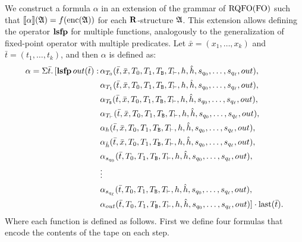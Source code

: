 We construct a formula $\alpha$ in an extension of the grammar of ${\rm RQFO}({\rm FO})$ such that ${\llbracket{}{\alpha}\rrbracket}(\mathfrak{A}) = f({\rm enc}(\mathfrak{A}))$ for each $\mathbf{R}$-structure $\mathfrak{A}$. This extension allows defining the operator ${\bf lsfp}$ for multiple functions, analogously to the generalization of fixed-point operator with multiple predicates. Let $\bar{x} = (x_1,\ldots,x_k)$ and $\bar{t} = (t_1,\ldots,t_k)$, and then $\alpha$ is defined as:
\begin{align*}
\alpha = \Sigma{\bar{t}}.\,[{\bf lsfp} \, out(\bar{t}): \,&\alpha_{T_0}(\bar{t},\bar{x},T_0,T_1,T_{\mathtt{B}},T_{\vdash},h,\hat{h},s_{q_0},\ldots,s_{q_{\ell}},out),\\
	&\alpha_{T_1}(\bar{t},\bar{x},T_0,T_1,T_{\mathtt{B}},T_{\vdash},h,\hat{h},s_{q_0},\ldots,s_{q_{\ell}},out),\\
	&\alpha_{T_{\mathtt{B}}}(\bar{t},\bar{x},T_0,T_1,T_{\mathtt{B}},T_{\vdash},h,\hat{h},s_{q_0},\ldots,s_{q_{\ell}},out),\\
	&\alpha_{T_{\vdash}}(\bar{t},\bar{x},T_0,T_1,T_{\mathtt{B}},T_{\vdash},h,\hat{h},s_{q_0},\ldots,s_{q_{\ell}},out),\\
	&\alpha_{h}(\bar{t},\bar{x},T_0,T_1,T_{\mathtt{B}},T_{\vdash},h,\hat{h},s_{q_0},\ldots,s_{q_{\ell}},out),\\
	&\alpha_{\hat{h}}(\bar{t},\bar{x},T_0,T_1,T_{\mathtt{B}},T_{\vdash},h,\hat{h},s_{q_0},\ldots,s_{q_{\ell}},out),\\
	&\alpha_{s_{q_0}}(\bar{t},T_0,T_1,T_{\mathtt{B}},T_{\vdash},h,\hat{h},s_{q_0},\ldots,s_{q_{\ell}},out),\\
	&\vdots \\
	&\alpha_{s_{q_{\ell}}}(\bar{t},T_0,T_1,T_{\mathtt{B}},T_{\vdash},h,\hat{h},s_{q_0},\ldots,s_{q_{\ell}},out),\\
	&\alpha_{out}(\bar{t},T_0,T_1,T_{\mathtt{B}},T_{\vdash},h,\hat{h},s_{q_0},\ldots,s_{q_{\ell}},out)]\cdot \operatorname{last}(\bar{t}).
\end{align*}
Where each function is defined as follows. First we define four formulas that encode the contents of the tape on each step.
